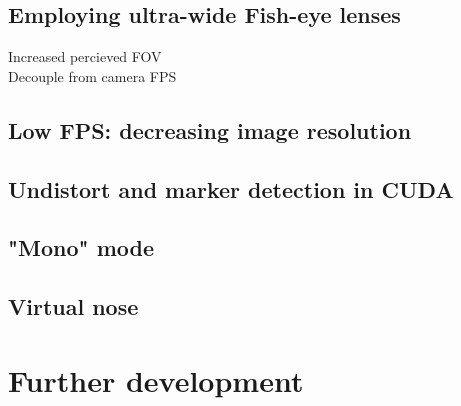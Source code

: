 \subsection{Employing ultra-wide Fish-eye lenses}
Increased percieved FOV \\
Decouple from camera FPS\\

\subsection{Low FPS: decreasing image resolution}

\subsection{Undistort and marker detection in CUDA}

\subsection{"Mono" mode}

\subsection{Virtual nose}
\fi

\section{Further development}

\iffalse
\subsection{Depth mapping with CUDA, stereo computer vision or depth sensor}

\subsection{Enhancing interactions with virtual hands with Leap Motion}

\subsection{Integration with ROS}
\fi